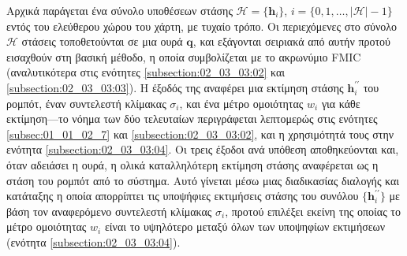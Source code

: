 Αρχικά παράγεται ένα σύνολο υποθέσεων στάσης $\mathcal{H} = \{\bm{h}_i\}$, $i =
\{0, 1, \dots, |\mathcal{H}|-1\}$ εντός του ελεύθερου χώρου του χάρτη, με
τυχαίο τρόπο. Οι περιεχόμενες στο σύνολο $\mathcal{H}$ στάσεις τοποθετούνται σε
μια ουρά $\bm{q}$, και εξάγονται σειριακά από αυτήν προτού εισαχθούν στη βασική
μέθοδο, η οποία συμβολίζεται με το ακρωνύμιο FMIC (αναλυτικότερα στις ενότητες
\ref{subsection:02_03_03:02} και \ref{subsection:02_03_03:03}). Η έξοδός της
αναφέρει μια εκτίμηση στάσης $\bm{h}_i^{\prime\prime}$ του ρομπότ, έναν
συντελεστή κλίμακας $\sigma_i$, και ένα μέτρο ομοιότητας $w_i$ για κάθε
εκτίμηση---το νόημα των δύο τελευταίων περιγράφεται λεπτομερώς στις ενότητες
\ref{subsec:01_01_02_7} και \ref{subsection:02_03_03:02}, και η χρησιμότητά
τους στην ενότητα \ref{subsection:02_03_03:04}. Οι τρεις έξοδοι ανά υπόθεση
αποθηκεύονται και, όταν αδειάσει η ουρά, η ολικά καταλληλότερη εκτίμηση στάσης
αναφέρεται ως η στάση του ρομπότ από το σύστημα. Αυτό γίνεται μέσω μιας
διαδικασίας διαλογής και κατάταξης η οποία απορρίπτει τις υποψήφιες εκτιμήσεις
στάσης του συνόλου $\{\bm{h}_i^{\prime\prime}\}$ με βάση τον αναφερόμενο
συντελεστή κλίμακας $\sigma_i$, προτού επιλέξει εκείνη της οποίας το μέτρο
ομοιότητας $w_i$ είναι το υψηλότερο μεταξύ όλων των υποψηφίων εκτιμήσεων
(ενότητα \ref{subsection:02_03_03:04}).

